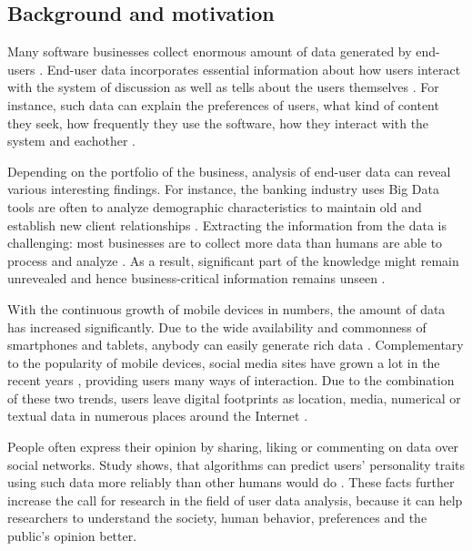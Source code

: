 \subsection{Background and motivation}
    Many software businesses collect enormous amount of data generated by end-users \cite{chinesemobilebankingusers, bigdatamanagementrevolution, inmon2007tapping}. End-user data incorporates essential information about how users interact with the system of discussion as well as tells about the users themselves \cite{jang2015noreciprocity, hu2014we, jang2016teensengagemorewithfewerphotos, han2016teensarefrommars, socialdiversityongithub}. For instance, such data can explain the preferences of users, what kind of content they seek, how frequently they use the software, how they interact with the system and eachother \cite{youyou2015computer, ottoni2013ladies}.

    Depending on the portfolio of the business, analysis of end-user data can reveal various interesting findings. For instance, the banking industry uses Big Data tools are often to analyze demographic characteristics to maintain old and establish new client relationships \cite{chinesemobilebankingusers, bigdatamanagementrevolution}. Extracting the information from the data is challenging: most businesses are to collect more data than humans are able to process and analyze \cite{inmon2007tapping, wegener2010integrating}. As a result, significant part of the knowledge might remain unrevealed and hence business-critical information remains unseen \cite{chinesemobilebankingusers, inmon2007tapping, wegener2010integrating, introtodatamining}. 

    With the continuous growth of mobile devices in numbers, the amount of data has increased significantly. Due to the wide availability and commonness of smartphones and tablets, anybody can easily generate rich data \cite{jang2016teensengagemorewithfewerphotos}. Complementary to the popularity of mobile devices, social media sites have grown a lot in the recent years \cite{hu2014we, ottoni2013ladies, bakhshi2014faces}, providing users many ways of interaction. Due to the combination of these two trends, users leave digital footprints as location, media, numerical or textual data in numerous places around the Internet \cite{youyou2015computer}. 
    
    People often express their opinion by sharing, liking or commenting on data over social networks. Study shows, that algorithms can predict users' personality traits using such data more reliably than other humans would do \cite{youyou2015computer}. These facts further increase the call for research in the field of user data analysis, because it can help researchers to understand the society, human behavior, preferences and the public's opinion better.


